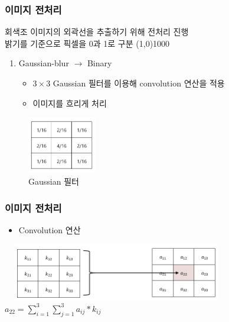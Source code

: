 \documentclass{beamer}
\begin{document}
	\begin{frame}{}
		\frametitle{이미지 전처리}
		회색조 이미지의 외곽선을 추출하기 위해 전처리 진행 \\
		밝기를 기준으로 픽셀을 0과 1로 구분
		\line(1,0){1000}
		\begin{enumerate}
			\item Gaussian-blur $ \rightarrow $ Binary
			\begin{itemize}
				\item $ 3 \times 3 $ Gaussian 필터를 이용해 convolution 연산을 적용 \\
				\item 이미지를 흐리게 처리
			\end{itemize}
		\end{enumerate}
		\begin{figure}
			\centering
			\includegraphics[width=3cm, height=2.5cm]{GaussianFilter.png} \\
			\vspace{-0.5em}
			\tiny{Gaussian 필터}
		\end{figure}
	\end{frame}
	\begin{frame}{}
		\frametitle{이미지 전처리}
		\begin{itemize}
			\item Convolution 연산
		\end{itemize}
		\includegraphics[width=10cm, height=2.5cm]{Convolution.png}
		\centering
		$ \displaystyle a_{22} = \sum_{i = 1}^{3} \sum_{j = 1}^{3} a_{ij} * k_{ij} $
	\end{frame}
\end{document}
